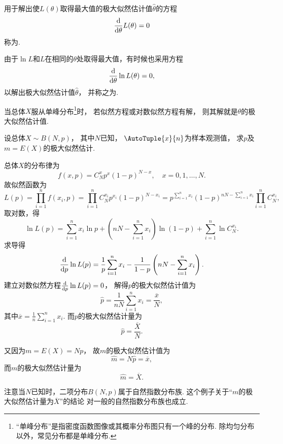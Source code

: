 \begin{definition}
用于解出使\(L(\theta)\)取得最大值的极大似然估计值\(\hat{\theta}\)的方程\[
	\dv{\theta} L(\theta) = 0
\]称为.

由于\(\ln L\)和\(L\)在相同的\(\theta\)处取得最大值，有时候也采用方程\[
	\dv{\theta} \ln L(\theta) = 0,
\]
以解出极大似然估计值\(\hat{\theta}\)，
并称之为.
\end{definition}

当总体\(X\)服从单峰分布\footnote{%
“单峰分布”是指密度函数图像或其概率分布图只有一个峰的分布.
除均匀分布以外，常见分布都是单峰分布.}时，
若似然方程或对数似然方程有解，
则其解就是\(\theta\)的极大似然估计值.

\begin{example}
设总体\(X \sim B(N,p)\)，
其中\(N\)已知，
\(\AutoTuple{x}{n}\)为样本观测值，
求\(p\)及\(m=E(X)\)的极大似然估计.
\begin{solution}
总体\(X\)的分布律为\[
	f(x,p)
	= C_N^x p^x (1-p)^{N-x},
	\quad x=0,1,\dots,N.
\]
故似然函数为\[
	L(p)
	= \prod_{i=1}^n f(x_i,p)
	= \prod_{i=1}^n C_N^{x_i} p^{x_i} (1-p)^{N-x_i}
	= p^{\sum_{i=1}^n x_i}
		(1-p)^{nN-\sum_{i=1}^n x_i}
		\prod_{i=1}^n C_N^{x_i},
\]
取对数，得\[
	\ln L(p)
	= \sum_{i=1}^n x_i \ln p
	+ \left(nN - \sum_{i=1}^n{x_i}\right) \ln(1-p)
	+ \sum_{i=1}^n \ln C_N^{x_i}.
\]
求导得\[
	\dv{p} \ln L(p)
	= \frac{1}{p} \sum_{i=1}^n{x_i}
	- \frac{1}{1-p} \left(nN - \sum_{i=1}^n{x_i}\right).
\]
建立对数似然方程\(\dv{p} \ln L(p) = 0\)，
解得\(p\)的极大似然估计值为\[
	\hat{p}
	= \frac{1}{nN} \sum_{i=1}^n x_i
	= \frac{\overline{x}}{N},
\]
其中\(\overline{x}=\frac{1}{n}\sum_{i=1}^n{x_i}\).
而\(p\)的极大似然估计量为\[
	\hat{p} = \frac{\overline{X}}{N}.
\]

又因为\(m=E(X)=Np\)，
故\(m\)的极大似然估计值为\[
	\hat{m} = N\hat{p} = \overline{x},
\]
而\(m\)的极大似然估计量为\[
	\hat{m} = \overline{X}.
\]
\end{solution}
\end{example}

注意当\(N\)已知时，二项分布\(B(N,p)\)属于自然指数分布族.
这个例子关于“\(m\)的极大似然估计量为\(\overline{X}\)”的结论
对一般的自然指数分布族也成立.

